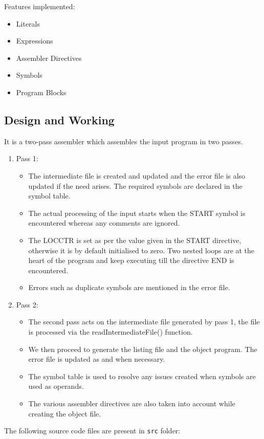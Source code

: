 \documentclass[
]{article}
\begin{document}
Features implemented:

\begin{itemize}
    \item
    Literals
    \item
    Expressions
    \item 
    Assembler Directives
    \item 
    Symbols
    \item 
    Program Blocks
\end{itemize}

\vspace{0.5cm}
\subsection{Design and Working}\label{design-and-working}

It is a two-pass assembler which assembles the input program in two
passes.

\begin{enumerate}
\def\labelenumi{\arabic{enumi})}
\item
  Pass 1:

  \begin{itemize}
  \item
    The intermediate file is created and updated and the error file is
    also updated if the need arises. The required symbols are declared
    in the symbol table.
  \item
    The actual processing of the input starts when the START symbol is
    encountered whereas any comments are ignored.
  \item
    The LOCCTR is set as per the value given in the START directive,
    otherwise it is by default initialised to zero. Two nested loops are at
    the heart of the program and keep executing till the directive END
    is encountered.
  \item
    Errors such as duplicate symbols are mentioned in the error file.
  \end{itemize}
\item
  Pass 2:

  \begin{itemize}
  \item
    The second pass acts on the intermediate file generated by pass 1,
    the file is processed via the readIntermediateFile() function.
  \item
    We then proceed to generate the listing file and the object program.
    The error file is updated as and when necessary.
  \item
    The symbol table is used to resolve any issues created when symbols
    are used as operands.
  \item
    The various assembler directives are also taken into account while
    creating the object file.
  \end{itemize}
\end{enumerate}
\vspace{0.2cm}
The following source code files are present in \texttt{src} folder:
\end{document}
